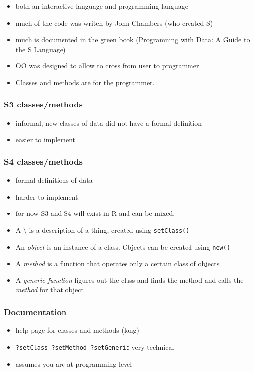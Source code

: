 \documentclass[11pt]{article}
\begin{document}
\begin{itemize}
\item both an interactive language and programming language
\item much of the code was writen by John Chambers (who created S)
\item much is documented in the green book (Programning with Data: A
  Guide to the S Language)
\item OO was designed to allow to cross from user to programmer.
\item Classes and methods are for the programmer.
\end{itemize}
\subsubsection{S3 classes/methods}
\label{sec-4-3-1}

\begin{itemize}
\item informal, new classes of data did not have a formal definition
\item easier to implement
\end{itemize}
\subsubsection{S4 classes/methods}
\label{sec-4-3-2}

\begin{itemize}
\item formal definitions of data
\item harder to implement
\item for now S3 and S4 will exist in R and can be mixed.
\item A \class\textbackslash{} is a description of a thing, created using \texttt{setClass()}
\item An \emph{object} is an instance of a class. Objects can be created using
  \texttt{new()}
\item A \emph{method} is a function that operates only a certain class of
  objects
\item A \emph{generic function} figures out the class and finds the method and
  calls the \emph{method} for that object
\end{itemize}
\subsubsection{Documentation}
\label{sec-4-3-3}

\begin{itemize}
\item help page for classes and methods (long)
\item \texttt{?setClass ?setMethod ?setGeneric} very technical
\item assumes you are at programming level
\end{itemize}
\end{document}
